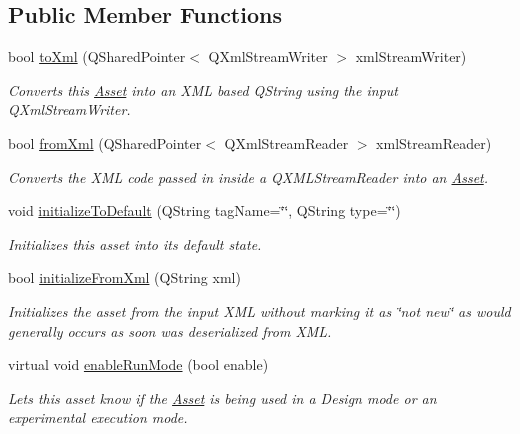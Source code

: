 \subsection*{Public Member Functions}
\begin{DoxyCompactItemize}
\item 
bool \hyperlink{class_picto_1_1_asset_a7cff8f6cde1f8fe85d4322a79469a7ba}{to\-Xml} (Q\-Shared\-Pointer$<$ Q\-Xml\-Stream\-Writer $>$ xml\-Stream\-Writer)
\begin{DoxyCompactList}\small\item\em Converts this \hyperlink{class_picto_1_1_asset}{Asset} into an X\-M\-L based Q\-String using the input Q\-Xml\-Stream\-Writer. \end{DoxyCompactList}\item 
bool \hyperlink{class_picto_1_1_asset_a8bed4da09ecb1c07ce0dab313a9aba67}{from\-Xml} (Q\-Shared\-Pointer$<$ Q\-Xml\-Stream\-Reader $>$ xml\-Stream\-Reader)
\begin{DoxyCompactList}\small\item\em Converts the X\-M\-L code passed in inside a Q\-X\-M\-L\-Stream\-Reader into an \hyperlink{class_picto_1_1_asset}{Asset}. \end{DoxyCompactList}\item 
void \hyperlink{class_picto_1_1_asset_ae39fd27817fd498d9e197b77bb942fe3}{initialize\-To\-Default} (Q\-String tag\-Name=\char`\"{}\char`\"{}, Q\-String type=\char`\"{}\char`\"{})
\begin{DoxyCompactList}\small\item\em Initializes this asset into its default state. \end{DoxyCompactList}\item 
bool \hyperlink{class_picto_1_1_asset_addca39719cf9832ebadbc0dd7083f53e}{initialize\-From\-Xml} (Q\-String xml)
\begin{DoxyCompactList}\small\item\em Initializes the asset from the input X\-M\-L without marking it as \char`\"{}not new\char`\"{} as would generally occurs as soon was deserialized from X\-M\-L. \end{DoxyCompactList}\item 
virtual void \hyperlink{class_picto_1_1_asset_a77d1ae8cf767529f2d4fc63d30b98b2d}{enable\-Run\-Mode} (bool enable)
\begin{DoxyCompactList}\small\item\em Lets this asset know if the \hyperlink{class_picto_1_1_asset}{Asset} is being used in a Design mode or an experimental execution mode. \end{DoxyCompactList}\item 

\end{DoxyCompactItemize}
